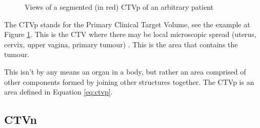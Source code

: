 \documentclass[11pt,twoside]{report}
\begin{document}
\begin{figure}[H]
  \centering
  \caption{Views of a segmented (in red) CTVp of an arbitrary patient}
  \label{fig:example-CTVp}
\end{figure}

The CTVp stands for the Primary Clinical Target Volume, see the example at Figure \ref{fig:example-CTVp}. This is the CTV where there may be local microscopic spread (uterus, cervix, upper vagina, primary tumour) \cite{AMLART-data}. This is the area that contains the tumour.

This isn't by any means an organ in a body, but rather an area comprised of other components formed by joining other structures together. The CTVp is an area defined in Equation \ref{eq:ctvp}.

\subsection{CTVn}\label{sec:data-CTVn}
\end{document}
